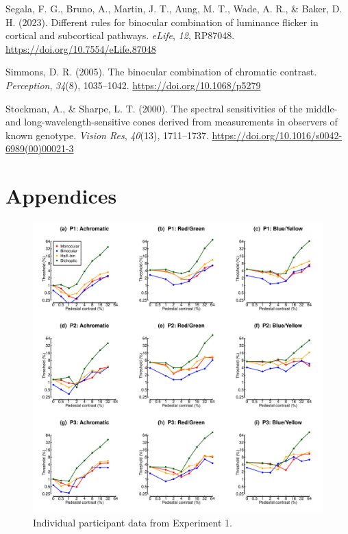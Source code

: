 \documentclass[
]{article}
\newlength{\cslhangindent}
\newlength{\cslentryspacingunit} %
\newenvironment{CSLReferences}[2] %
 {%
  \setlength{\parindent}{0pt}
  \ifodd #1
  \let\oldpar\par
  \def\par{\hangindent=\cslhangindent\oldpar}
  \fi
  \setlength{\parskip}{#2\cslentryspacingunit}
 }%
 {}
\begin{document}
\begin{CSLReferences}{1}{0}
\leavevmode{}%
Segala, F. G., Bruno, A., Martin, J. T., Aung, M. T., Wade, A. R., \& Baker, D. H. (2023). Different rules for binocular combination of luminance flicker in cortical and subcortical pathways. \emph{eLife}, \emph{12}, RP87048. \url{https://doi.org/10.7554/eLife.87048}

\leavevmode{}%
Simmons, D. R. (2005). The binocular combination of chromatic contrast. \emph{Perception}, \emph{34}(8), 1035--1042. \url{https://doi.org/10.1068/p5279}

\leavevmode{}%
Stockman, A., \& Sharpe, L. T. (2000). The spectral sensitivities of the middle- and long-wavelength-sensitive cones derived from measurements in observers of known genotype. \emph{Vision Res}, \emph{40}(13), 1711--1737. \url{https://doi.org/10.1016/s0042-6989(00)00021-3}

\end{CSLReferences}

\hypertarget{appendices}{%
\section{Appendices}\label{appendices}}

\setcounter{table}{0}  \renewcommand{\thetable}{A\arabic{table}} \setcounter{figure}{0} \renewcommand{\thefigure}{A\arabic{figure}}

\begin{figure}

{\centering \includegraphics{Figures/individualdippers} 

}

\caption{Individual participant data from Experiment 1.}\label{fig:individualdips}
\end{figure}
\end{document}
